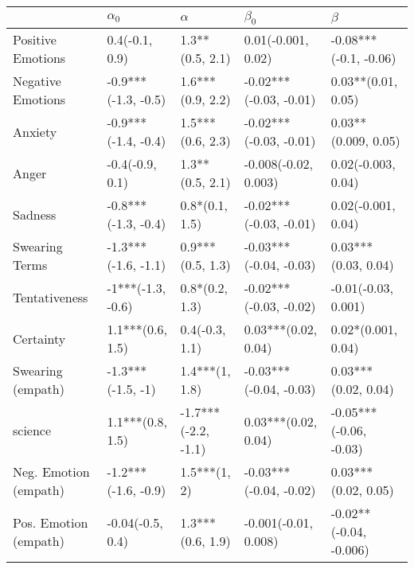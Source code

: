 \begin{tabular}{lllll}
\toprule
{} &           $\alpha_0$ &             $\alpha$ &               $\beta_0$ &                 $\beta$ \\
\midrule
Positive Emotions     &       0.4(-0.1, 0.9) &      1.3**(0.5, 2.1) &      0.01(-0.001, 0.02) &   -0.08***(-0.1, -0.06) \\
Negative Emotions     &  -0.9***(-1.3, -0.5) &     1.6***(0.9, 2.2) &  -0.02***(-0.03, -0.01) &      0.03**(0.01, 0.05) \\
Anxiety               &  -0.9***(-1.4, -0.4) &     1.5***(0.6, 2.3) &  -0.02***(-0.03, -0.01) &     0.03**(0.009, 0.05) \\
Anger                 &      -0.4(-0.9, 0.1) &      1.3**(0.5, 2.1) &    -0.008(-0.02, 0.003) &      0.02(-0.003, 0.04) \\
Sadness               &  -0.8***(-1.3, -0.4) &       0.8*(0.1, 1.5) &  -0.02***(-0.03, -0.01) &      0.02(-0.001, 0.04) \\
Swearing Terms        &  -1.3***(-1.6, -1.1) &     0.9***(0.5, 1.3) &  -0.03***(-0.04, -0.03) &     0.03***(0.03, 0.04) \\
Tentativeness         &    -1***(-1.3, -0.6) &       0.8*(0.2, 1.3) &  -0.02***(-0.03, -0.02) &     -0.01(-0.03, 0.001) \\
Certainty             &     1.1***(0.6, 1.5) &       0.4(-0.3, 1.1) &     0.03***(0.02, 0.04) &      0.02*(0.001, 0.04) \\
Swearing (empath)     &    -1.3***(-1.5, -1) &       1.4***(1, 1.8) &  -0.03***(-0.04, -0.03) &     0.03***(0.02, 0.04) \\
science               &     1.1***(0.8, 1.5) &  -1.7***(-2.2, -1.1) &     0.03***(0.02, 0.04) &  -0.05***(-0.06, -0.03) \\
Neg. Emotion (empath) &  -1.2***(-1.6, -0.9) &         1.5***(1, 2) &  -0.03***(-0.04, -0.02) &     0.03***(0.02, 0.05) \\
Pos. Emotion (empath) &     -0.04(-0.5, 0.4) &     1.3***(0.6, 1.9) &    -0.001(-0.01, 0.008) &  -0.02**(-0.04, -0.006) \\
\bottomrule
\end{tabular}
